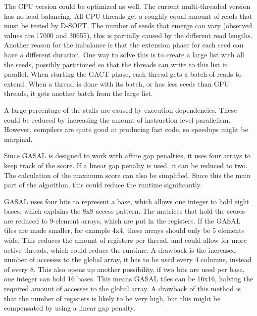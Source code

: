 \documentclass[../thesis.tex]{subfiles}
\begin{document}
The CPU version could be optimized as well.
The current multi-threaded version has no load balancing.
All CPU threads get a roughly equal amount of reads that must be tested by D-SOFT.
The number of seeds that emerge can vary (observed values are 17000 and 30655), this is partially caused by the different read lengths.
Another reason for the imbalance is that the extension phase for each seed can have a different duration.
One way to solve this is to create a large list with all the seeds, possibly partitioned so that the threads can write to this list in parallel.
When starting the GACT phase, each thread gets a batch of reads to extend.
When a thread is done with its batch, or has less seeds than GPU threads, it gets another batch from the large list.

A large percentage of the stalls are caused by execution dependencies.
These could be reduced by increasing the amount of instruction level parallelism.
However, compilers are quite good at producing fast code, so speedups might be marginal.

Since GASAL is designed to work with affine gap penalties, it uses four arrays to keep track of the score.
If a linear gap penalty is used, it can be reduced to two.
The calculation of the maximum score can also be simplified.
Since this the main part of the algorithm, this could reduce the runtime significantly.

GASAL uses four bits to represent a base, which allows one integer to hold eight bases, which explains the 8x8 access pattern.
The matrices that hold the scores are reduced to 9-element arrays, which are put in the registers.
If the GASAL tiles are made smaller, for example 4x4, these arrays should only be 5 elements wide.
This reduces the amount of registers per thread, and could allow for more active threads, which could reduce the runtime.
A drawback is the increased number of accesses to the global array, it has to be used every 4 columns, instead of every 8.
This also opens up another possibility, if two bits are used per base, one integer can hold 16 bases.
This means GASAL tiles can be 16x16, halving the required amount of accesses to the global array.
A drawback of this method is that the number of registers is likely to be very high, but this might be compensated by using a linear gap penalty.
\end{document}
